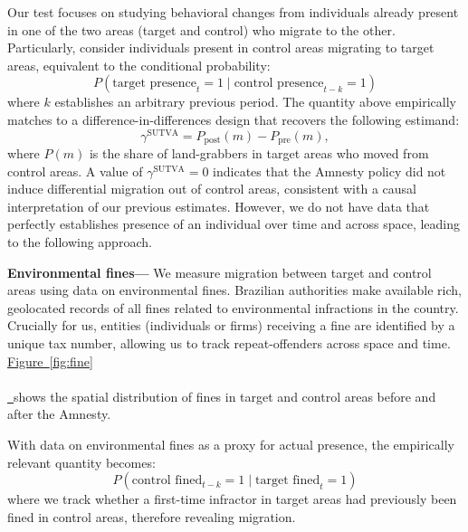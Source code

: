 \documentclass[12pt]{article}
\newcommand*{\figref}[2][]{%
  \hyperref[{fig:#2}]{%
    Figure~\ref*{fig:#2}%
    \ifx\\#1\\%
    \else
      \,#1%
    \fi
  }%
}
\begin{document}
\quad Our test focuses on studying behavioral changes from individuals already present in one of the two areas (target and control) who migrate to the other. Particularly, consider individuals present in control areas migrating to target areas, equivalent to the conditional probability:
\begin{equation*}
P(\text{target presence}_t = 1 \mid \text{control presence}_{t-k} = 1)
\end{equation*}
where $k$ establishes an arbitrary previous period. The quantity above empirically matches to a difference-in-differences design that recovers the following estimand:
\begin{equation*}
  \gamma^\text{SUTVA}=P_\text{post}(m)-P_\text{pre}(m),
\end{equation*}
where $P(m)$ is the share of land-grabbers in target areas who moved from control areas. A value of $\gamma^{\text{SUTVA}}=0$ indicates that the Amnesty policy did not induce differential migration out of control areas, consistent with a causal interpretation of our previous estimates. However, we do not have data that perfectly establishes presence of an individual over time and across space, leading to the following approach.
\ 

\quad \textbf{Environmental fines---} We measure migration between target and control areas using data on environmental fines. Brazilian authorities make available rich, geolocated records of all fines related to environmental infractions in the country. Crucially for us, entities (individuals or firms) receiving a fine are identified by a unique tax number, allowing us to track repeat-offenders across space and time.  \figref{fine} shows the spatial distribution of fines in target and control areas before and after the Amnesty.
\

\quad With data on environmental fines as a proxy for actual presence, the empirically relevant quantity becomes:
\begin{equation}
P(\text{control fined}_{t-k} = 1 \mid \text{target fined}_t = 1)
\label{eq:main_cond}
\end{equation}\normalsize
where we track whether a first-time infractor in target areas had previously been fined in control areas, therefore revealing migration. 
\ 
\end{document}
